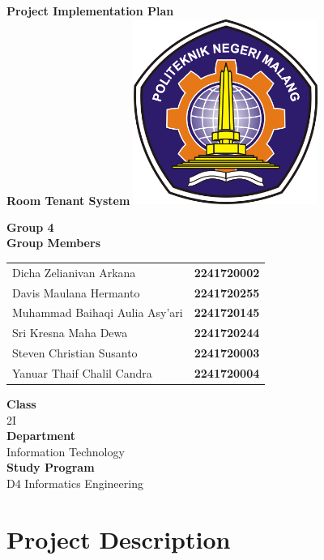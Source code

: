 \documentclass[12pt,titlepage,a4paper]{report}
\newcommand{\vSubject}{Project Implementation Plan}
\newcommand{\vSubtitle}{Room Tenant System}
\newcommand{\vClass}{2I}
\newcommand{\vGroup}{Group 4}
\newcommand{\vDepartment}{Information Technology}
\newcommand{\vStudyProgram}{D4 Informatics Engineering}
\begin{document}
\begin{titlepage}
    \centering
    \vfill
    {\bfseries\LARGE
        \vSubject\\
        \vskip0.25cm
        \vSubtitle
    }
    \vfill
    \includegraphics[width=6cm]{images/polinema-logo.png}
    \vfill
    {
        \textbf{\vGroup} \\
        \vspace{0.5cm}
        \textbf{Group Members}\\
        \vspace{0.5cm}
        \begin{tabular}{l l}
            Dicha Zelianivan Arkana         & \textbf{2241720002} \\
            Davis Maulana Hermanto          & \textbf{2241720255} \\
            Muhammad Baihaqi Aulia Asy'ari  & \textbf{2241720145} \\
            Sri Kresna Maha Dewa            & \textbf{2241720244} \\
            Steven Christian Susanto        & \textbf{2241720003} \\
            Yanuar Thaif Chalil Candra      & \textbf{2241720004} \\            
        \end{tabular}
        \vskip0.5cm
        \textbf{Class}\\
        \vClass\\
        \vskip0.5cm
        \textbf{Department}\\
        \vDepartment\\
        \vskip0.5cm
        \textbf{Study Program}\\
        \vStudyProgram
    }
\end{titlepage}

\tableofcontents

\newpage

\chapter{Project Description}
\end{document}
